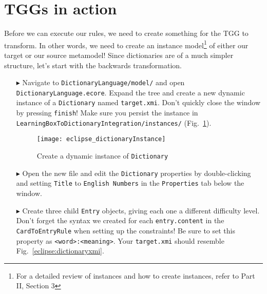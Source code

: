 \newpage
\section{TGGs in action}
\genHeader
\label{sect:TGGs_in_Action}

Before we can execute our rules, we need to create something for the TGG to transform. In other words, we need to create an instance model\footnote{For a
detailed review of instances and how to create instances, refer to Part II, Section 3} of either our target or our source metamodel! Since dictionaries are of a
much simpler structure, let's start with the backwards transformation.

\begin{itemize}

\item[$\blacktriangleright$] Navigate to \texttt{Dictionary\-Language/model/} and open \texttt{Dictio\-nary\-Lang\-uage.ecore}. Expand the tree and create a new
dynamic instance of a \texttt{Dictionary} named \texttt{target.xmi}. Don't quickly close the window by pressing \texttt{finish}! Make sure you persist the instance in
\texttt{Learn\-ing\-Box\-To\-Dictionary\-In\-te\-gra\-tion/in\-stan\-ces/} (Fig.~\ref{eclipse:create_instance_dict}).

\begin{figure}[htbp]
\begin{center}
  \texttt{[image: eclipse\_dictionaryInstance]}
  \caption{Create a dynamic instance of \texttt{Dictionary}}
  \label{eclipse:create_instance_dict}
\end{center}
\end{figure}

\newpage

\item[$\blacktriangleright$] Open the new file and edit the \texttt{Dictionary} properties by double-clicking and setting \texttt{Title} to \texttt{English
Numbers} in the \texttt{Properties} tab below the window.

\vspace{0.5cm}

\item[$\blacktriangleright$] Create three child \texttt{Entry} objects, giving each one a different difficulty level. Don't forget the syntax we created for
each \texttt{entry.content} in the \texttt{CardToEntryRule} when setting up the constraints! Be sure to set this property as \texttt{<word>:<meaning>}. Your
\texttt{target.xmi} should resemble Fig.~\ref{eclipse:dictionaryxmi}.


\end{itemize}
